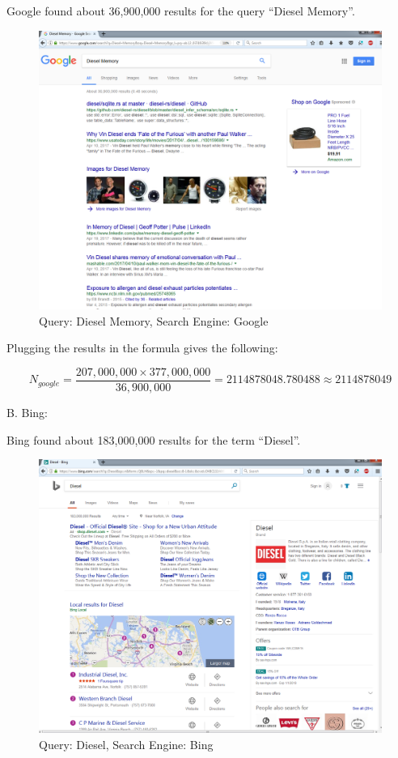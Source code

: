 \documentclass[a4paper, 11pt]{article}
\begin{document}
\pagebreak
Google found about 36,900,000 results for the query ``Diesel Memory''.
\begin{figure}[h]
\caption{Query: Diesel Memory, Search Engine: Google}
\centering
\includegraphics[scale=0.4]{Q1/DieselMemoryGoogle.png}
\end{figure}

Plugging the results in the formula gives the following:

$$N_{google} = \frac{207,000,000 \times 377,000,000}{36,900,000} = 2114878048.780488 \approx 2114878049
$$


\pagebreak

B. Bing:

Bing found about 183,000,000 results for the term ``Diesel''.
\begin{figure}[h]
\caption{Query: Diesel, Search Engine: Bing}
\centering
\includegraphics[scale=0.4]{Q1/DieselBing.png}
\end{figure}
\end{document}
